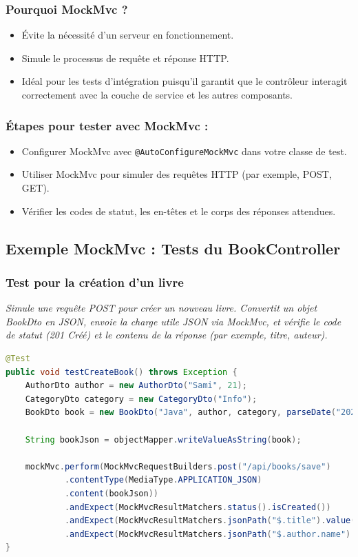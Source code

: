 \documentclass[a4paper,12pt]{article}
\begin{document}
\subsubsection{Pourquoi MockMvc ?}
\begin{itemize}
    \item Évite la nécessité d'un serveur en fonctionnement.
    \item Simule le processus de requête et réponse HTTP.
    \item Idéal pour les tests d'intégration puisqu'il garantit que le contrôleur interagit correctement avec la couche de service et les autres composants.
\end{itemize}

\subsubsection{Étapes pour tester avec MockMvc :}
\begin{itemize}
    \item Configurer MockMvc avec \texttt{@AutoConfigureMockMvc} dans votre classe de test.
    \item Utiliser MockMvc pour simuler des requêtes HTTP (par exemple, POST, GET).
    \item Vérifier les codes de statut, les en-têtes et le corps des réponses attendues.
\end{itemize}

\subsection{Exemple MockMvc : Tests du BookController}
\subsubsection{Test pour la création d'un livre}
\textit{Simule une requête POST pour créer un nouveau livre. Convertit un objet BookDto en JSON, envoie la charge utile JSON via MockMvc, et vérifie le code de statut (201 Créé) et le contenu de la réponse (par exemple, titre, auteur).}

\newpage
\begin{lstlisting}[language=Java]
@Test
public void testCreateBook() throws Exception {
    AuthorDto author = new AuthorDto("Sami", 21);
    CategoryDto category = new CategoryDto("Info");
    BookDto book = new BookDto("Java", author, category, parseDate("2024-11-20"));

    String bookJson = objectMapper.writeValueAsString(book);

    mockMvc.perform(MockMvcRequestBuilders.post("/api/books/save")
            .contentType(MediaType.APPLICATION_JSON)
            .content(bookJson))
            .andExpect(MockMvcResultMatchers.status().isCreated())
            .andExpect(MockMvcResultMatchers.jsonPath("$.title").value("Java"))
            .andExpect(MockMvcResultMatchers.jsonPath("$.author.name").value("Sami"));
}
\end{lstlisting}
\end{document}
